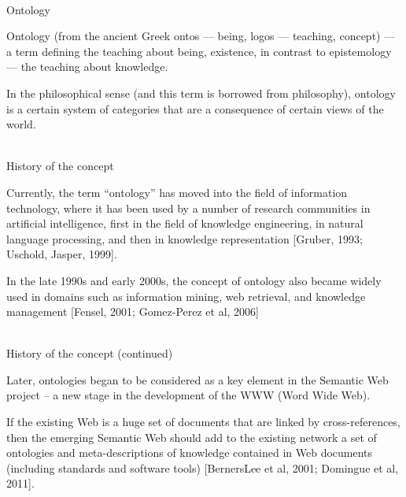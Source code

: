 \begin{frame}{\\Ontology}
	\topline
	\justifying
	
	Ontology (from the ancient Greek ontos --- being, logos --- teaching, concept) --- a term defining the teaching about being, existence, in contrast to epistemology --- the teaching about knowledge.
	
	\vspace{1em}
	
	In the philosophical sense (and this term is borrowed from philosophy), ontology is a certain system of categories that are a consequence of certain views of the world.
	
\end{frame}

\begin{frame}{\\History of the concept}
	\topline
	\justifying
	
	\vspace{10mm}
	
	Currently, the term “ontology” has moved into the field of information technology, where it has been used by a number of research communities in artificial intelligence, first in the field of knowledge engineering, in natural language processing, and then in knowledge representation [Gruber, 1993; Uschold, Jasper, 1999].
	
	\vspace{0.5em}
	
	In the late 1990s and early 2000s, the concept of ontology also became widely used in domains such as information mining, web retrieval, and knowledge management [Fensel, 2001; Gomez-Perez et al, 2006]
	
\end{frame}

\begin{frame}{\\History of the concept (continued)}
	\topline
	\justifying
	
	Later, ontologies began to be considered as a key element in the Semantic Web project -- a new stage in the development of the WWW (Word Wide Web).
	
	\vspace{1em}
	
	If the existing Web is a huge set of documents that are linked by cross-references, then the emerging Semantic Web should add to the existing network a set of ontologies and meta-descriptions of knowledge contained in Web documents (including standards and software tools) [BernersLee et al, 2001; Domingue et al, 2011].
	
\end{frame}

